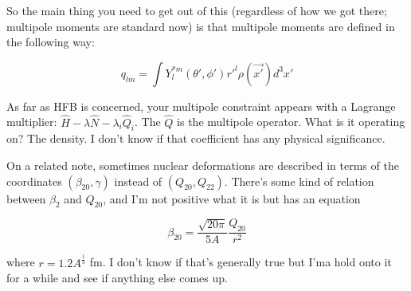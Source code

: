 So the main thing you need to get out of this (regardless of how we got there; multipole moments are standard now) is that multipole moments are defined in the following way:

\begin{equation*}
q_{lm} = \int Y_l^{*m}(\theta',\phi')r'^l\rho(\vec{x'})d^3x'
\end{equation*}

As far as HFB is concerned, your multipole constraint appears with a Lagrange multiplier: $\hat{H} - \lambda\hat{N} - \lambda_i \hat{Q}_i$. The $\hat{Q}$ is the multipole operator. What is it operating on? The density. I don't know if that coefficient has any physical significance.

On a related note, sometimes nuclear deformations are described in terms of the coordinates $(\beta_{20}, \gamma)$ instead of $(Q_{20},Q_{22})$. There's some kind of relation between $\beta_2$ and $Q_{20}$, and I'm not positive what it is but \cite{Giuliani2017} has an equation

\begin{equation*}
\beta_{20} = \frac{\sqrt{20\pi}}{5A}\frac{Q_{20}}{r^2}
\end{equation*}

\noindent where $r=1.2A^\frac{1}{3}$ fm. I don't know if that's generally true but I'ma hold onto it for a while and see if anything else comes up.